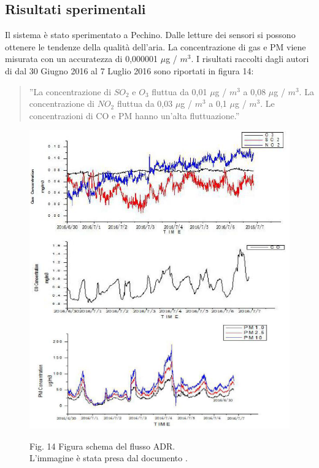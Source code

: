 \documentclass[a4paper]{report} %
\begin{document}
\subsection{Risultati sperimentali}
Il sistema è stato sperimentato a Pechino. Dalle letture dei sensori si possono ottenere le tendenze della qualità dell'aria. La concentrazione di gas e PM viene misurata con un accuratezza di 0,000001 $\mu$g / $ m^3 $. I risultati raccolti dagli autori di \cite{art:rif.40} dal 30 Giugno 2016 al 7 Luglio 2016 sono riportati in figura 14:
\begin{quote}
	''La concentrazione di $ SO_{2} $ e $ O_{3} $ fluttua da 0,01 $\mu$g / $ m^3 $ a 0,08 $\mu$g / $m^3$. La concentrazione di $ NO_{2} $ fluttua da 0,03 $\mu$g / $m^3$ a 0,1 $\mu$g / $m^3$. Le concentrazioni di CO e PM hanno un'alta fluttuazione.''
\end{quote}  
\begin{figure}
	\centering
	\includegraphics[scale=.5]{Immagini/risAria.png}
	
	Fig. 14 Figura schema del flusso ADR.\\
	L'immagine è stata presa dal documento \cite{art:rif.40}.\\
\end{figure}
\end{document}
